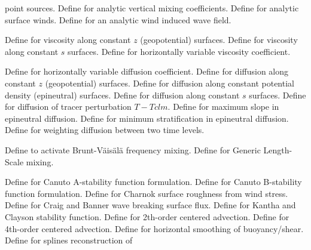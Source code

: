 \begin{klist}
\begin{klist}
  point sources.
        Define for analytic vertical mixing
  coefficients.
       Define for analytic surface winds.
       Define for an analytic wind induced wave
  field.
  \end{klist}
   \mbox{}
  \begin{klist}
       Define for viscosity along constant $z$
   (geopotential) surfaces.
       Define for viscosity along constant $s$
   surfaces.
        Define for horizontally variable viscosity
     coefficient.
  \end{klist}
   \mbox{}
  \begin{klist}
        Define for horizontally variable diffusion
     coefficient.
       Define for diffusion along constant $z$
   (geopotential) surfaces.
       Define for diffusion along constant potential
   density (epineutral) surfaces.
       Define for diffusion along constant $s$
   surfaces.
       Define for diffusion of tracer perturbation
   $T-Tclm$.
       Define for maximum slope in
   epineutral diffusion.
       Define for minimum stratification in
   epineutral diffusion.
       Define for weighting diffusion between
   two time levels.
  \end{klist}
   \mbox{}
  \begin{klist}
       Define to activate Brunt-V\"ais\"al\"a
   frequency mixing.
       Define for Generic Length-Scale mixing.
    \begin{klist}
         Define for Canuto A-stability function
       formulation.
         Define for Canuto B-stability function
       formulation.
         Define for Charnok surface roughness from wind
       stress.
         Define for Craig and Banner wave breaking
       surface flux.
         Define for Kantha and Clayson stability
       function.
         Define for 2th-order centered advection.
         Define for 4th-order centered advection.
         Define for horizontal smoothing of
       buoyancy/shear.
         Define for splines reconstruction of

\end{klist}
\end{klist}
\end{klist}
